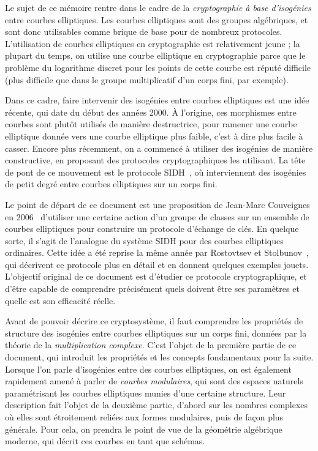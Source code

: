 \documentclass[11pt,a4paper]{article}
\renewcommand{\v}{\vspace{5mm}}
\theoremstyle{definition}
\begin{document}
Le sujet de ce mémoire rentre dans le cadre de la \emph{cryptographie à base d'isogénies} entre courbes elliptiques. Les courbes elliptiques sont des groupes algébriques, et sont donc utilisables comme brique de base pour de nombreux protocoles. L'utilisation de courbes elliptiques en cryptographie est relativement jeune ; la plupart du temps, on utilise une courbe elliptique en cryptographie parce que le problème du logarithme discret pour les points de cette courbe est réputé difficile (plus difficile que dans le groupe multiplicatif d'un corps fini, par exemple).

Dans ce cadre, faire intervenir des isogénies entre courbes elliptiques est une idée récente, qui date du début des années 2000. À l'origine, ces morphismes entre courbes sont plutôt utilisés de manière destructrice, pour ramener une courbe elliptique donnée vers une courbe elliptique plus faible, c'est à dire plus facile à casser. Encore plus récemment, on a commencé à utiliser des isogénies de manière constructive, en proposant des protocoles cryptographiques les utilisant. La tête de pont de ce mouvement est le protocole SIDH~\cite{...}, où interviennent des isogénies de petit degré entre courbes elliptiques sur un corps fini.

Le point de départ de ce document est une proposition de Jean-Marc Couveignes en 2006~\cite{...} d'utiliser une certaine action d'un groupe de classes sur un ensemble de courbes elliptiques pour construire un protocole d'échange de clés. En quelque sorte, il s'agit de l'analogue du système SIDH pour des courbes elliptiques ordinaires. Cette idée a été reprise la même année par Rostovtsev et Stolbunov~\cite{...}, qui décrivent ce protocole plus en détail et en donnent quelques exemples jouets. L'objectif original de ce document est d'étudier ce protocole cryptographique, et d'être capable de comprendre précisément quels doivent être ses paramètres et quelle est son efficacité réelle.

\v
Avant de pouvoir décrire ce cryptosystème, il faut comprendre les propriétés de structure des isogénies entre courbes elliptiques sur un corps fini, données par la théorie de la \emph{multiplication complexe}. C'est l'objet de la première partie de ce document, qui introduit les propriétés et les concepts fondamentaux pour la suite. Lorsque l'on parle d'isogénies entre des courbes elliptiques, on est également rapidement amené à parler de \emph{courbes modulaires}, qui sont des espaces naturels paramétrisant les courbes elliptiques munies d'une certaine structure. Leur description fait l'objet de la deuxième partie, d'abord sur les nombres complexes où elles sont étroitement reliées aux formes modulaires, puis de façon plus générale. Pour cela, on prendra le point de vue de la géométrie algébrique moderne, qui décrit ces courbes en tant que schémas.
\end{document}
